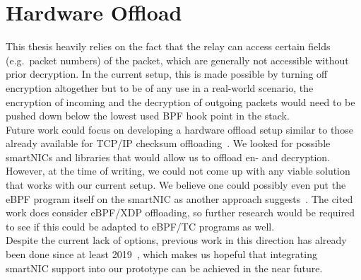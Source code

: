 \section{Hardware Offload}\label{sec:hardware_offload}
This thesis heavily relies on the fact that the relay can
access certain fields (e.g.~packet numbers) of the packet, 
which are generally not accessible without prior decryption.
In the current setup, this is made possible by turning off 
encryption altogether but to be of any use in a real-world
scenario, the encryption of incoming and the decryption of
outgoing packets would need to be pushed down below the lowest 
used BPF hook point in the stack.
\\
Future work could focus on developing a hardware offload 
setup similar to those already available for TCP/IP checksum 
offloading~\parencite{tcp-ip-offload-engine}.
We looked for possible smartNICs and libraries that would allow us
to offload en- and decryption.
However, at the time of writing, we could not come up with any viable solution
that works with our current setup. 
We believe one could possibly even put the eBPF program itself on the smartNIC as 
another approach suggests~\parencite{ebpf-offload-smartnics}.
The cited work does consider eBPF/XDP offloading, so further 
research would be required to see if this could be adapted to eBPF/TC 
programs as well.
\\
Despite the current lack of options, previous work in this direction has already been 
done since at least 2019~\parencite{quic-nic-offload}, which makes us hopeful that
integrating smartNIC support into our prototype can be achieved in the near future.